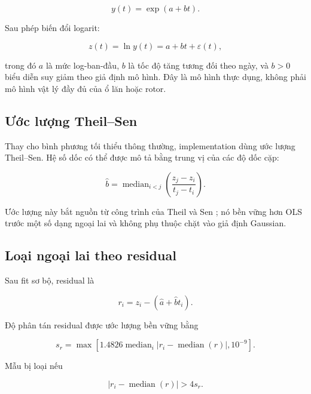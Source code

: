 \documentclass[12pt,a4paper]{article}
\begin{document}
\begin{equation}
  y(t)=\exp(a+bt).
  \label{eq:exponential}
\end{equation}

Sau phép biến đổi logarit:

\begin{equation}
  z(t)=\ln y(t)=a+bt+\varepsilon(t),
  \label{eq:log-linear}
\end{equation}

trong đó $a$ là mức log-ban-đầu, $b$ là tốc độ tăng tương đối theo ngày, và $b>0$ biểu diễn suy giảm theo giả định mô hình. Đây là mô hình thực dụng, không phải mô hình vật lý đầy đủ của ổ lăn hoặc rotor.

\subsection{Ước lượng Theil--Sen}

Thay cho bình phương tối thiểu thông thường, implementation dùng ước lượng Theil--Sen. Hệ số dốc có thể được mô tả bằng trung vị của các độ dốc cặp:

\begin{equation}
  \widehat b=\operatorname{median}_{i<j}
  \left(\frac{z_j-z_i}{t_j-t_i}\right).
  \label{eq:theil-sen}
\end{equation}

Ước lượng này bắt nguồn từ công trình của Theil \cite{theil1950} và Sen \cite{sen1968}; nó bền vững hơn OLS trước một số dạng ngoại lai và không phụ thuộc chặt vào giả định Gaussian.

\subsection{Loại ngoại lai theo residual}

Sau fit sơ bộ, residual là

\begin{equation}
  r_i=z_i-(\widehat a+\widehat b t_i).
\end{equation}

Độ phân tán residual được ước lượng bền vững bằng

\begin{equation}
  s_r=\max\left[
    1.4826\operatorname{median}_i
    \left|r_i-\operatorname{median}(r)\right|,
    10^{-9}
  \right].
\end{equation}

Mẫu bị loại nếu

\begin{equation}
  \left|r_i-\operatorname{median}(r)\right|>4s_r.
\end{equation}
\end{document}
